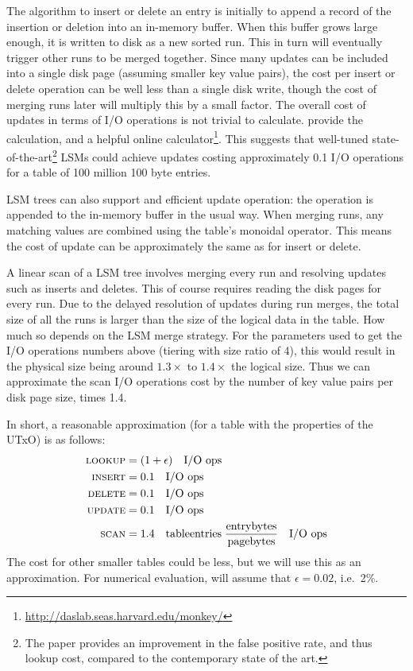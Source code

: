 \documentclass[11pt,a4paper]{article}
\begin{document}
The algorithm to insert or delete an entry is initially to append a record of
the insertion or deletion into an in-memory buffer. When this buffer grows
large enough, it is written to disk as a new sorted run. This in turn will
eventually trigger other runs to be merged together. Since many updates can be
included into a single disk page (assuming smaller key value pairs), the cost
per insert or delete operation can be well less than a single disk write,
though the cost of merging runs later will multiply this by a small factor.
The overall cost of updates in terms of I/O operations is not trivial to
calculate. \cite{monkey} provide the calculation, and a helpful online
calculator\footnote{\url{http://daslab.seas.harvard.edu/monkey/}}. This
suggests that well-tuned state-of-the-art\footnote{The paper provides an
improvement in the false positive rate, and thus lookup cost, compared to the
contemporary state of the art.} LSMs could achieve updates costing approximately
0.1 I/O operations for a table of 100 million 100 byte entries.

LSM trees can also support and efficient {\sc update} operation: the operation
is appended to the in-memory buffer in the usual way. When merging runs, any
matching values are combined using the table's monoidal operator. This means
the cost of {\sc update} can be approximately the same as for {\sc insert} or
{\sc delete}.

A linear scan of a LSM tree involves merging every run and resolving updates
such as inserts and deletes. This of course requires reading the disk pages for
every run. Due to the delayed resolution of updates during run merges, the
total size of all the runs is larger than the size of the logical data in the
table. How much so depends on the LSM merge strategy. For the parameters used
to get the I/O operations numbers above (tiering with size ratio of 4), this
would result in the physical size being around $1.3\times$ to $1.4\times$ the
logical size. Thus we can approximate the {\sc scan} I/O operations cost by the
number of key value pairs per disk page size, times 1.4.

In short, a reasonable approximation (for a table with the properties of the
UTxO) is as follows:
\begin{equation}\label{eq:io-ops-write-optimised}
\begin{aligned}
\text{\sc lookup} & = (1 + \epsilon) \quad \text{I/O ops} \\
\text{\sc insert} & = 0.1 \quad \text{I/O ops} \\
\text{\sc delete} & = 0.1 \quad \text{I/O ops} \\
\text{\sc update} & = 0.1 \quad \text{I/O ops} \\
\text{\sc scan}   & = 1.4 \quad \text{tableentries} \; \frac{\text{entrybytes}}{\text{pagebytes}} \quad \text{I/O ops} \\
\end{aligned}
\end{equation}
The cost for other smaller tables could be less, but we will use this as an
approximation. For numerical evaluation, will assume that $\epsilon = 0.02$,
i.e.~2\%.
\end{document}

